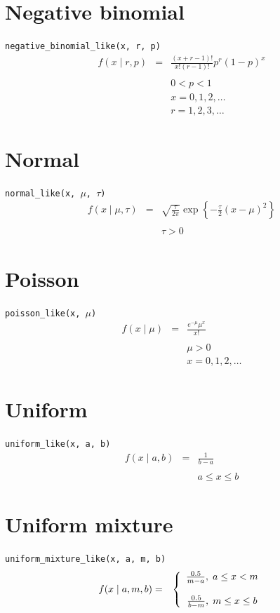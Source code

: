 \documentclass[]{book}
\begin{document}
\section*{Negative binomial}
\verb=negative_binomial_like(x, r, p)=
\begin{eqnarray*}
f(x \mid r, p) &=& \frac{(x+r-1)!}{x! (r-1)!} p^r (1-p)^x \\
\\
&&0 < p < 1 \\
&&x = 0,1,2,\ldots \\
&&r=1,2,3,\ldots
\end{eqnarray*}

\section*{Normal}
\verb=normal_like(x, =$\mu$\verb=, =$\tau$\verb=)=
\begin{eqnarray*}
f(x \mid \mu, \tau) &=& \sqrt{\frac{\tau}{2\pi}} \exp\left\{ -\frac{\tau}{2} (x-\mu)^2 \right\}\\
\\
&& \tau > 0
\end{eqnarray*}

\section*{Poisson}
\verb=poisson_like(x, =$\mu$\verb=)=
\begin{eqnarray*}
f(x \mid \mu) &=& \frac{e^{-\mu}\mu^x}{x!}\\
\\
&& \mu > 0\\
&& x = 0,1,2,\ldots
\end{eqnarray*}

\section*{Uniform}
\verb=uniform_like(x, a, b)=
\begin{eqnarray*}
f(x \mid a, b) &=& \frac{1}{b-a}\\
\\
&& a \le x \le b
\end{eqnarray*}

\section*{Uniform mixture}
\verb=uniform_mixture_like(x, a, m, b)=
\begin{eqnarray*}
f(x \mid a, m, b) &=& \left\{\begin{array}{c}\frac{0.5}{m-a}, \hspace{0.1cm} a \le x < m \\
\\  
\frac{0.5}{b-m}, \hspace{0.1cm}m \le x \le b \end{array}\right. 
\end{eqnarray*}
\end{document}
